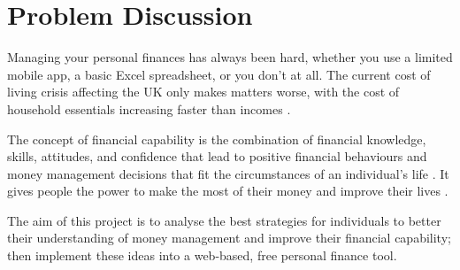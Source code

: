 \section{Problem Discussion}
Managing your personal finances has always been hard, whether you use a limited mobile app, a basic Excel spreadsheet, or you don't at all. The current cost of living crisis affecting the UK only makes matters worse, with the cost of household essentials increasing faster than incomes \cite{hourston_2022}.  

The concept of financial capability is the combination of financial knowledge, skills, attitudes, and confidence that lead to positive financial behaviours and money management decisions that fit the circumstances of an individual's life \cite{FinancialCapabilityAU}. It gives people the power to make the most of their money and improve their lives \cite{FinancialCapabilityUK}.

The aim of this project is to analyse the best strategies for individuals to better their understanding of money management and improve their financial capability; then implement these ideas into a web-based, free personal finance tool.
